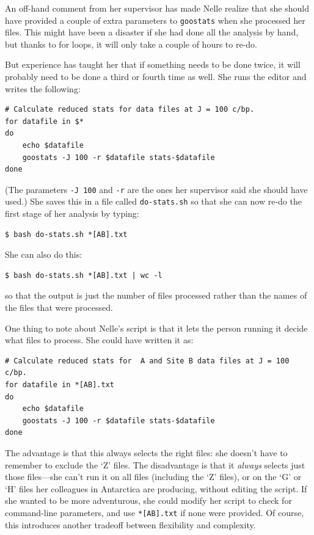 \documentclass{book}
\begin{document}
An off-hand comment from her supervisor has made Nelle realize that she
should have provided a couple of extra parameters to \texttt{goostats}
when she processed her files. This might have been a disaster if she had
done all the analysis by hand, but thanks to for loops, it will only
take a couple of hours to re-do.

But experience has taught her that if something needs to be done twice,
it will probably need to be done a third or fourth time as well. She
runs the editor and writes the following:

\begin{verbatim}
# Calculate reduced stats for data files at J = 100 c/bp.
for datafile in $*
do
    echo $datafile
    goostats -J 100 -r $datafile stats-$datafile
done
\end{verbatim}

(The parameters \texttt{-J 100} and \texttt{-r} are the ones her
supervisor said she should have used.) She saves this in a file called
\texttt{do-stats.sh} so that she can now re-do the first stage of her
analysis by typing:

\begin{verbatim}
$ bash do-stats.sh *[AB].txt
\end{verbatim}

She can also do this:

\begin{verbatim}
$ bash do-stats.sh *[AB].txt | wc -l
\end{verbatim}

so that the output is just the number of files processed rather than the
names of the files that were processed.

One thing to note about Nelle's script is that it lets the person
running it decide what files to process. She could have written it as:

\begin{verbatim}
# Calculate reduced stats for  A and Site B data files at J = 100 c/bp.
for datafile in *[AB].txt
do
    echo $datafile
    goostats -J 100 -r $datafile stats-$datafile
done
\end{verbatim}

The advantage is that this always selects the right files: she doesn't
have to remember to exclude the `Z' files. The disadvantage is that it
\emph{always} selects just those files---she can't run it on all files
(including the `Z' files), or on the `G' or `H' files her colleagues in
Antarctica are producing, without editing the script. If she wanted to
be more adventurous, she could modify her script to check for
command-line parameters, and use \texttt{*{[}AB{]}.txt} if none were
provided. Of course, this introduces another tradeoff between
flexibility and complexity.
\end{document}
